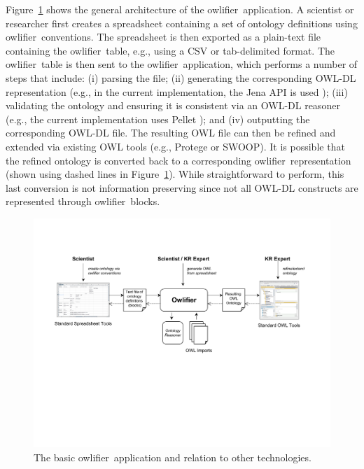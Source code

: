 \documentclass[5p,authoryear]{elsarticle}
\newcommand{\owlifier}{\textsf{owlifier}}
\newcommand{\figref}[1]{Figure~\ref{#1}}
\begin{document}
\figref{fig:owlifier} shows the general architecture of the \owlifier\
application. A scientist or researcher first creates a spreadsheet
containing a set of ontology definitions using \owlifier\ conventions.
The spreadsheet is then exported as a plain-text file containing the
\owlifier\ table, e.g., using a CSV or tab-delimited format. The
\owlifier\ table is then sent to the \owlifier\ application, which
performs a number of steps that include: (i) parsing the file; (ii)
generating the corresponding OWL-DL representation (e.g., in the
current implementation, the Jena API is used \cite{carroll04:_jena});
(iii) validating the ontology and ensuring it is consistent via an
OWL-DL reasoner (e.g., the current implementation uses Pellet
\cite{sirin07:_pellet}); and (iv) outputting the corresponding OWL-DL
file. The resulting OWL file can then be refined and extended via
existing OWL tools (e.g., Protege or SWOOP). It is possible that the
refined ontology is converted back to a corresponding \owlifier\
representation (shown using dashed lines in
\figref{fig:owlifier}). While straightforward to perform, this last
conversion is not information preserving since not all OWL-DL
constructs are represented through \owlifier\ blocks.

\begin{figure}
  \centering
  \includegraphics[scale=.5]{architecture.pdf}
  \caption{The basic \owlifier\ application and relation to other
    technologies.}
  \label{fig:owlifier}
\end{figure}
\end{document}
